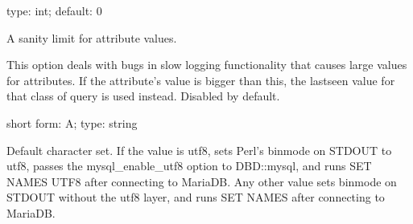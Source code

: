 \documentclass[letterpaper,10pt,english]{sphinxmanual}
\begin{document}

\begin{fulllineitems}
\label{\detokenize{mariadb-query-digest:cmdoption-mariadb-query-digest-attribute-value-limit}}
type: int; default: 0

A sanity limit for attribute values.

This option deals with bugs in slow logging functionality that causes large
values for attributes.  If the attribute’s value is bigger than this, the
last\sphinxhyphen{}seen value for that class of query is used instead.
Disabled by default.

\end{fulllineitems}


\begin{fulllineitems}
\label{\detokenize{mariadb-query-digest:cmdoption-mariadb-query-digest-charset}}
short form: \sphinxhyphen{}A; type: string

Default character set.  If the value is utf8, sets Perl’s binmode on
STDOUT to utf8, passes the mysql\_enable\_utf8 option to DBD::mysql, and
runs SET NAMES UTF8 after connecting to MariaDB.  Any other value sets
binmode on STDOUT without the utf8 layer, and runs SET NAMES after
connecting to MariaDB.

\end{fulllineitems}
\end{document}
